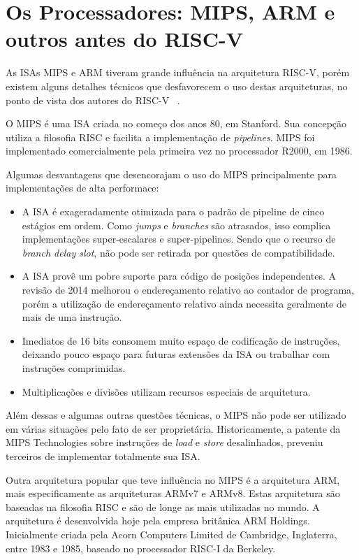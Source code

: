 	\section{Os Processadores: MIPS, ARM e outros antes do RISC-V}

		As ISAs MIPS e ARM tiveram grande influência na arquitetura RISC-V, porém existem alguns detalhes técnicos que desfavorecem o uso destas arquiteturas, no ponto de vista dos autores do RISC-V ~\cite{Waterman:EECS-2016-1}.

		O MIPS é uma ISA criada no começo dos anos 80, em Stanford. Sua concepção utiliza a filosofia RISC e facilita a implementação de \textit{pipelines}. MIPS foi implementado comercialmente pela primeira vez no processador R2000, em 1986.

		Algumas desvantagens que desencorajam o uso do MIPS principalmente para implementações de alta performace:
		\begin{itemize}
			\item A ISA é exageradamente otimizada para o padrão de pipeline de cinco estágios em ordem. Como \textit{jumps} e \textit{branches} são atrasados, isso complica implementações super-escalares e super-pipelines. Sendo que o recurso de \textit{branch delay slot}, não pode ser retirada por questões de compatibilidade.

			\item A ISA provê um pobre suporte para código de posições independentes. A revisão de 2014 melhorou o endereçamento relativo ao contador de programa, porém a utilização de endereçamento relativo ainda necessita geralmente de mais de uma instrução.

			\item Imediatos de 16 bits consomem muito espaço de codificação de instruções, deixando pouco espaço para futuras extensões da ISA ou trabalhar com instruções comprimidas.

			\item Multiplicações e divisões utilizam recursos especiais de arquitetura.
		\end{itemize}

		Além dessas e algumas outras questões técnicas, o MIPS não pode ser utilizado em várias situações pelo fato de ser proprietária. Historicamente, a patente da MIPS Technologies sobre instruções de \textit{load} e \textit{store} desalinhados, preveniu terceiros de implementar totalmente sua ISA.

		Outra arquitetura popular que teve influência no MIPS é a arquitetura ARM, mais especificamente as arquiteturas ARMv7 e ARMv8. Estas arquitetura são baseadas na filosofia RISC e são de longe as mais utilizadas no mundo. A arquitetura é desenvolvida hoje pela empresa britânica ARM Holdings. Inicialmente criada pela Acorn Computers Limited de Cambridge, Inglaterra, entre 1983 e 1985, baseado no processador RISC-I da Berkeley.

